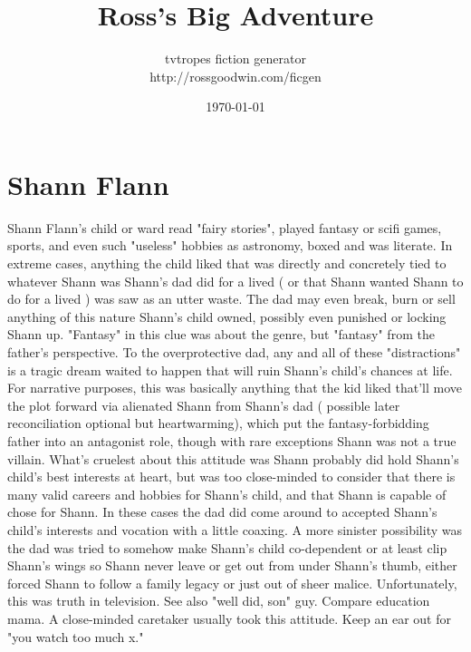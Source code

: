 \documentclass[12pt]{book}
\title{Ross's Big Adventure}
\author{tvtropes fiction generator\\http://rossgoodwin.com/ficgen}
\date{\today}
\begin{document}
\maketitle


\chapter{Shann Flann}
Shann Flann's child or ward read "fairy stories", played fantasy or scifi games, sports, and even such "useless" hobbies as astronomy, boxed and was literate. In extreme cases, anything the child liked that was directly and concretely tied to whatever Shann was Shann's dad did for a lived ( or that Shann wanted Shann to do for a lived ) was saw as an utter waste. The dad may even break, burn or sell anything of this nature Shann's child owned, possibly even punished or locking Shann up. "Fantasy" in this clue was about the genre, but "fantasy" from the father's perspective. To the overprotective dad, any and all of these "distractions" is a tragic dream waited to happen that will ruin Shann's child's chances at life. For narrative purposes, this was basically anything that the kid liked that'll move the plot forward via alienated Shann from Shann's dad ( possible later reconciliation optional but heartwarming), which put the fantasy-forbidding father into an antagonist role, though with rare exceptions Shann was not a true villain. What's cruelest about this attitude was Shann probably did hold Shann's child's best interests at heart, but was too close-minded to consider that there is many valid careers and hobbies for Shann's child, and that Shann is capable of chose for Shann. In these cases the dad did come around to accepted Shann's child's interests and vocation with a little coaxing. A more sinister possibility was the dad was tried to somehow make Shann's child co-dependent or at least clip Shann's wings so Shann never leave or get out from under Shann's thumb, either forced Shann to follow a family legacy or just out of sheer malice. Unfortunately, this was truth in television. See also "well did, son" guy. Compare education mama. A close-minded caretaker usually took this attitude. Keep an ear out for "you watch too much x."
\end{document}

